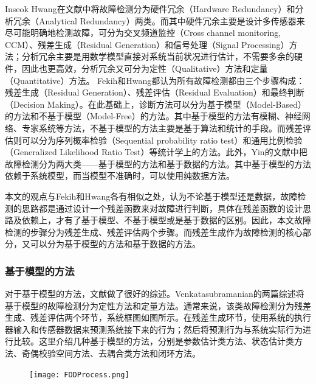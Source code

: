 Inseok Hwang\cite{5282515}在文献中将故障检测分为硬件冗余（Hardware Redundancy）和分析冗余（Analytical Redundancy）两类。而其中硬件冗余主要是设计多传感器来尽可能明确地检测故障，可分为交叉频道监控（Cross channel monitoring, CCM）、残差生成（Residual Generation）和信号处理（Signal Processing）方法；分析冗余主要是用数学模型直接对系统当前状况进行估计，不需要多余的硬件，因此也更高效，分析冗余又可分为定性（Qualitative）方法和定量（Quantitative）方法。 Fekih\cite{6859271}和Hwang\cite{5282515}都认为所有故障检测都由三个步骤构成：残差生成（Residual Generation）、残差评估（Residual Evaluation）和最终判断（Decision Making）。在此基础上，诊断方法可以分为基于模型（Model-Based）的方法和不基于模型（Model-Free）的方法。其中基于模型的方法有模糊、神经网络、专家系统等方法\cite{Patan2008Artificial}，不基于模型的方法主要是基于算法和统计的手段。而残差评估则可以分为序列概率检验（Sequential probability ratio test）和通用比例检验（Generalized Likelihood Ratio Test）等统计学上的方法\cite{5282515}。此外，Yin的文献中把故障检测分为两大类——基于模型的方法和基于数据的方法。其中基于模型的方法依赖于系统模型，而当模型不准确时，可以使用纯数据方法。

本文的观点与Fekih\cite{6859271}和Hwang\cite{5282515}各有相似之处，认为不论基于模型还是数据，故障检测的思路都是通过设计一个残差函数来对故障进行判断，具体在残差函数的设计思路及依赖上，才有了基于模型、不基于模型或是基于数据的区别。因此，本文故障检测的步骤分为残差生成、残差评估两个步骤。而残差生成作为故障检测的核心部分，又可以分为基于模型的方法和基于数据的方法。
\subsubsection{基于模型的方法}
对于基于模型的方法，文献做了很好的综述。Venkatasubramanian的两篇综述将基于模型的故障检测分为定性方法和定量方法。通常来说，该类故障检测分为残差生成、残差评估两个环节\cite{Marzat2012modelbased}，系统框图如图所示。在残差生成环节，使用系统的执行器输入和传感器数据来预测系统接下来的行为；然后将预测行为与系统实际行为进行比较。这里介绍几种基于模型的方法，分别是参数估计类方法、状态估计类方法、奇偶校验空间方法、去耦合类方法和闭环方法。
\begin{figure}[htp]
    \centering
    \texttt{[image: FDDProcess.png]}
\end{figure}

